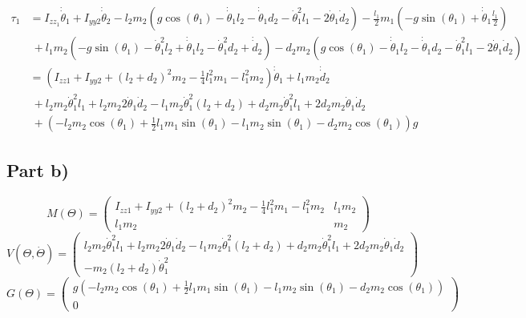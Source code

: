 \documentclass[10pt,a4paper]{article}
\begin{document}
\begin{align*}
  \tau_{1} & = I_{zz_{1}}\dot{\dot{\theta}}_{1} + I_{yy2}\dot{\dot{\theta}}_{2} - l_{2}m_{2}\left( g\cos(\theta_{1}) - \dot{\dot{\theta}}_{1}l_{2} - \dot{\dot{\theta}}_{1}d_{2} - \dot{\theta}_{1}^{2}l_{1} - 2\dot{\theta}_{1}\dot{d}_{2} \right) - \frac{l_{1}}{2}m_{1}\left( -g\sin(\theta_{1}) + \dot{\dot{\theta}}_{1} \frac{l_{1}}{2} \right)\\
           &\ + l_{1}m_{2}\left( -g\sin(\theta_{1}) - \dot{\theta}_{1}^{2}l_{2} + \dot{\dot{\theta}}_{1}l_{2} - \dot{\theta}_{1}^{2}d_{2} + \dot{\dot{d}}_{2} \right) - d_{2}m_{2} \left( g\cos(\theta_{1}) - \dot{\dot{\theta}}_{1}l_{2} - \dot{\dot{\theta}}_{1}d_{2} - \dot{\theta}_{1}^{2}l_{1} - 2\dot{\theta}_{1}\dot{d}_{2} \right)\\
           & = \left( I_{zz1} + I_{yy2} + (l_{2} + d_{2})^{2}m_{2} - \frac{1}{4}l_{1}^{2}m_{1} - l_{1}^{2}m_{2} \right)\dot{\dot{\theta}}_{1} + l_{1}m_{2}\dot{\dot{d}}_{2}\\
           &\ + l_{2}m_{2}\dot{\theta}_{1}^{2}l_{1} + l_{2}m_{2}2\dot{\theta}_{1}\dot{d}_{2} - l_{1}m_{2}\dot{\theta}_{1}^{2}(l_{2} + d_{2}) + d_{2}m_{2}\dot{\theta}_{1}^{2}l_{1} + 2d_{2}m_{2}\dot{\theta}_{1}\dot{d}_{2}\\
           &\ + \left( -l_{2}m_{2}\cos(\theta_{1}) + \frac{1}{2}l_{1}m_{1}\sin(\theta_{1}) - l_{1}m_{2}\sin(\theta_{1}) - d_{2}m_{2}\cos(\theta_{1}) \right)g
\end{align*}

\subsection*{Part b)}

\begin{equation*}
  M(\Theta) = \begin{pmatrix}
    I_{zz1} + I_{yy2} + (l_{2} + d_{2})^{2}m_{2} - \frac{1}{4}l_{1}^{2}m_{1} - l_{1}^{2}m_{2} & l_{1}m_{2}\\
    l_{1}m_{2} & m_{2}
  \end{pmatrix}
\end{equation*}
\begin{equation*}
  V(\Theta, \dot{\Theta}) = \begin{pmatrix}
    l_{2}m_{2}\dot{\theta}_{1}^{2}l_{1} + l_{2}m_{2}2\dot{\theta}_{1}\dot{d}_{2} - l_{1}m_{2}\dot{\theta}_{1}^{2}(l_{2} + d_{2}) + d_{2}m_{2}\dot{\theta}_{1}^{2}l_{1} + 2d_{2}m_{2}\dot{\theta}_{1}\dot{d}_{2}\\
    -m_{2}(l_{2} + d_{2})\dot{\theta}_{1}^{2}
  \end{pmatrix}
\end{equation*}
\begin{equation*}
  G(\Theta) = \begin{pmatrix}
    g\left( -l_{2}m_{2}\cos(\theta_{1}) + \frac{1}{2}l_{1}m_{1}\sin(\theta_{1}) - l_{1}m_{2}\sin(\theta_{1}) - d_{2}m_{2}\cos(\theta_{1}) \right)\\
    0
  \end{pmatrix}
\end{equation*}
\end{document}
